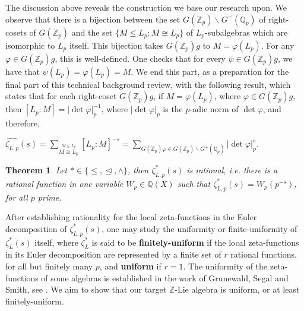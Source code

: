 \documentclass[12pt]{article}
\newtheorem{theorem}{Theorem}[subsection]
\begin{document}
The discussion above reveals the construction we base our research upon.
We observe that there is a bijection between the set $G(\mathbb{Z}_p)\backslash G^+(\mathbb{Q}_p)$ of right-cosets of $G(\mathbb{Z}_p)$ and the set $\{M\leq L_{p} : M\cong L_{p}\}$ of $L_{p}$-subalgebras which are isomorphic to $L_{p}$ itself. This bijection takes $G(\mathbb{Z}_p)g$ to $M=\varphi(L_{p})$. For any $\varphi\in G(\mathbb{Z}_p)g$, this is well-defined. One checks that for every $\psi\in G(\mathbb{Z}_p)g$, we have that $\psi(L_{p})=\varphi(L_{p})=M$.
We end this part, as a preparation for the final part of this technical background review, with the following result, which states that for each right-coset $G(\mathbb{Z}_p)g$, if $M=\varphi(L_{p})$, where $\varphi\in G(\mathbb{Z}_p)g$, then $[L_{p}:M]=|\det\varphi|_p^{-1}$, where $|\det\varphi|_p$ is the $p$-adic norm of $\det\varphi$, and therefore,\par $\hat{\zeta_{L,p}}(s)=\underset{\overset{\scriptscriptstyle M\leq L_{p}}{\scriptscriptstyle M\cong L_{p}}}{\sum}[L_{p}:M]^{-s}=\underset{\scriptscriptstyle G(\mathbb{Z}_p)\varphi\in G(\mathbb{Z}_p)\backslash G^+(\mathbb{Q}_p)}{\sum}|\det\varphi|_p^s$.
\begin{theorem}
\label{thm.rational.function}
Let $\ast\in\{\leq,\trianglelefteq,\wedge\}$, then $\zeta_{L,p}^{\ast}(s)$ is rational, i.e. there is a rational function in one variable $W_p\in\mathbb{Q}(X)$ such that $\zeta_{L,p}^{\ast}(s)=W_p(p^{-s})$, for all $p$ prime.
\end{theorem}
After establishing rationality for the local zeta-functions in the Euler decomposition of $\zeta_{L,p}^{\ast}(s)$, one may study the uniformity or finite-uniformity of $\zeta_{L}^{\ast}(s)$ itself, where $\zeta_{L}^{\ast}$ is said to be \textbf{finitely-uniform} if the local zeta-functions in its Euler decomposition are represented by a finite set of $r$ rational functions, for all but finitely many $p$, and \textbf{uniform} if $r=1$.
The uniformity of the zeta-functions of some algebras is established in the work of Grunewald, Segal and Smith, see \cite{GrunewaldSegalSmith}. We aim to show that our target $\mathbb{Z}$-Lie algebra is uniform, or at least finitely-uniform.
\end{document}

